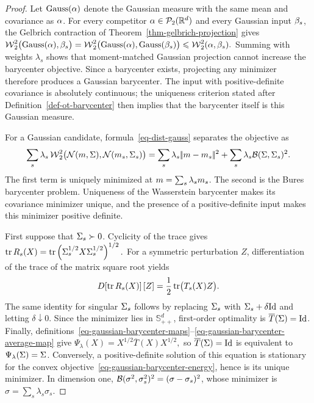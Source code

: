 \begin{proof}
Let $\operatorname{Gauss}(\alpha)$ denote the Gaussian measure with the same mean and covariance as $\alpha$. For every competitor $\alpha\in\mathcal{P}_2(\mathbb{R}^d)$ and every Gaussian input $\beta_s$, the Gelbrich contraction of Theorem~\ref{thm-gelbrich-projection} gives
\(\operatorname{\mathcal{W}}_2^2\bigl(\operatorname{Gauss}(\alpha),\beta_s\bigr) = \operatorname{\mathcal{W}}_2^2\bigl(\operatorname{Gauss}(\alpha),\operatorname{Gauss}(\beta_s)\bigr) \leqslant \operatorname{\mathcal{W}}_2^2(\alpha,\beta_s).\)
Summing with weights $\lambda_s$ shows that moment-matched Gaussian projection cannot increase the barycenter objective. Since a barycenter exists, projecting any minimizer therefore produces a Gaussian barycenter. The input with positive-definite covariance is absolutely continuous; the uniqueness criterion stated after Definition~\ref{def-ot-barycenter} then implies that the barycenter itself is this Gaussian measure.

For a Gaussian candidate, formula~\eqref{eq-dist-gauss} separates the objective as
\[
\sum_s\lambda_s\operatorname{\mathcal{W}}_2^2\bigl(\mathcal{N}(m,\Sigma),\mathcal{N}(m_s,\Sigma_s)\bigr)
=
\sum_s\lambda_s|\!| m-m_s |\!|^2
+
\sum_s\lambda_s\mathcal{B}(\Sigma,\Sigma_s)^2.
\]
The first term is uniquely minimized at $m=\sum_s\lambda_sm_s$. The second is the Bures barycenter problem. Uniqueness of the Wasserstein barycenter makes its covariance minimizer unique, and the presence of a positive-definite input makes this minimizer positive definite.

First suppose that $\Sigma_s\succ0$. Cyclicity of the trace gives \(\operatorname{tr} R_s(X) = \operatorname{tr}\left( \Sigma_s^{1/2}X\Sigma_s^{1/2} \right)^{1/2}.\)
For a symmetric perturbation $Z$, differentiation of the trace of the matrix square root yields
\[
D\!\left[\operatorname{tr} R_s(X)\right][Z]
=
\frac12\operatorname{tr}\bigl(T_s(X)Z\bigr).
\]
The same identity for singular $\Sigma_s$ follows by replacing $\Sigma_s$ with $\Sigma_s+\delta\mathrm{Id}$ and letting $\delta\downarrow0$. Since the minimizer lies in $\mathbb S_{++}^d$, first-order optimality is $\overline T(\Sigma)=\mathrm{Id}$. Finally, definitions~\eqref{eq-gaussian-barycenter-maps}--\eqref{eq-gaussian-barycenter-average-map} give
\(\Psi_\lambda(X) = X^{1/2}\overline T(X)X^{1/2},\)
so $\overline T(\Sigma)=\mathrm{Id}$ is equivalent to $\Psi_\lambda(\Sigma)=\Sigma$. Conversely, a positive-definite solution of this equation is stationary for the convex objective~\eqref{eq-gaussian-barycenter-energy}, hence is its unique minimizer. In dimension one, $\mathcal{B}(\sigma^2,\sigma_s^2)^2=(\sigma-\sigma_s)^2$, whose minimizer is $\sigma=\sum_s\lambda_s\sigma_s$.
\end{proof}
